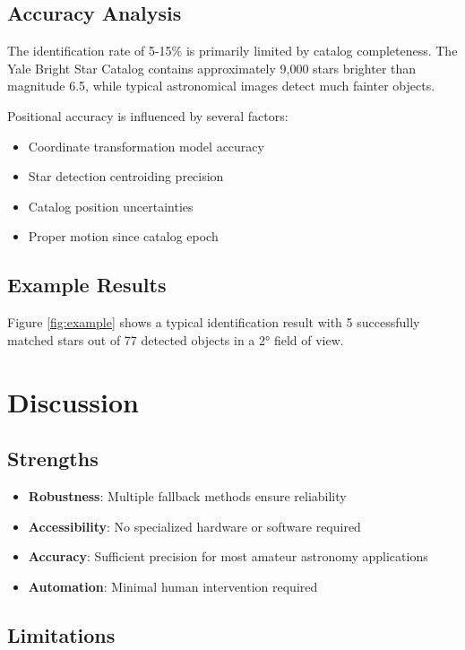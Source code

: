 \documentclass[11pt,a4paper]{article}
\begin{document}
\subsection{Accuracy Analysis}

The identification rate of 5-15\% is primarily limited by catalog completeness. The Yale Bright Star Catalog contains approximately 9,000 stars brighter than magnitude 6.5, while typical astronomical images detect much fainter objects.

Positional accuracy is influenced by several factors:
\begin{itemize}
    \item Coordinate transformation model accuracy
    \item Star detection centroiding precision
    \item Catalog position uncertainties
    \item Proper motion since catalog epoch
\end{itemize}

\subsection{Example Results}

Figure \ref{fig:example} shows a typical identification result with 5 successfully matched stars out of 77 detected objects in a 2° field of view.

\section{Discussion}

\subsection{Strengths}

\begin{itemize}
    \item \textbf{Robustness}: Multiple fallback methods ensure reliability
    \item \textbf{Accessibility}: No specialized hardware or software required
    \item \textbf{Accuracy}: Sufficient precision for most amateur astronomy applications
    \item \textbf{Automation}: Minimal human intervention required
\end{itemize}

\subsection{Limitations}
\end{document}
